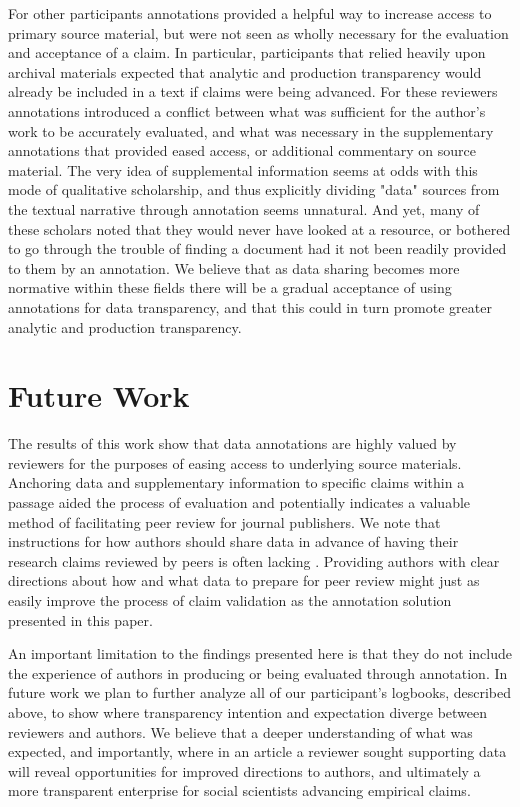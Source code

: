 \documentclass[sigchi]{acmart}
\begin{document}
For other participants annotations provided a helpful way to increase access to primary source material, but were not seen as wholly necessary for the evaluation and acceptance of a claim. In particular, participants that relied heavily upon archival materials expected that analytic and production transparency would already be included in a text if claims were being advanced. For these reviewers annotations introduced a conflict between what was sufficient for the author's work to be accurately evaluated, and what was necessary in the supplementary annotations that provided eased access, or additional commentary on source material. The very idea of supplemental information seems at odds with this mode of qualitative scholarship, and thus explicitly dividing "data" sources from the textual narrative through annotation seems unnatural. And yet, many of these scholars noted that they would never have looked at a resource, or bothered to go through the trouble of finding a document had it not been readily provided to them by an annotation. We believe that as data sharing becomes more normative within these fields there will be a gradual acceptance of using annotations for data transparency, and that this could in turn promote greater analytic and production transparency. 

\section{Future Work}
The results of this work show that data annotations are highly valued by reviewers for the purposes of easing access to underlying source materials. Anchoring data and supplementary information to specific claims within a passage aided the process of evaluation and potentially indicates a valuable method of facilitating peer review for journal publishers. We note that instructions for how authors should share data in advance of having their research claims reviewed by peers is often lacking \cite{kratz_researcher_2015}. Providing authors with clear directions about how and what data to prepare for peer review might just as easily improve the process of claim validation as the annotation solution presented in this paper. 

An important limitation to the findings presented here is that they do not include the experience of authors in producing or being evaluated through annotation. In future work we plan to further analyze all of our participant's logbooks, described above, to show where transparency intention and expectation diverge between reviewers and authors. We believe that a deeper understanding of what was expected, and importantly, where in an article a reviewer sought supporting data will reveal opportunities for improved directions to authors, and ultimately a more transparent enterprise for social scientists advancing empirical claims. 
\end{document}
